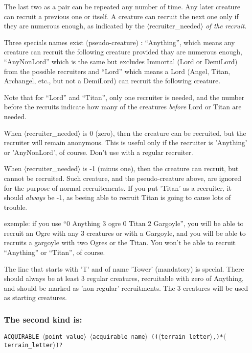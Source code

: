 \documentclass{article}
\begin{document}
The last two as a pair can be repeated any number of time.
Any later creature can recruit a previous one or itself.
A creature can recruit the next one only if they are numerous
enough, as indicated by the $\langle$recruiter\_needed$\rangle$ \emph{of the recruit}.

Three specials names exist (pseudo-creature) : ``Anything'', which
means any creature can recruit the following creature provided
thay are numerous enough, ``AnyNonLord'' which is the same but
excludes Immortal (Lord or DemiLord) from the possible recruiters
and ``Lord''  which means a Lord (Angel, Titan, Archangel, etc., but
not a DemiLord) can recruit the following creature.

Note that for ``Lord'' and ``Titan'', only one recruiter
is needed, and the number before the recruits indicate
how many of the creatures \emph{before} Lord or Titan are
needed.

When $\langle$recruiter\_needed$\rangle$ is 0 (zero), then the creature
can be recruited, but the recruiter will remain anonymous.
This is useful only if the recruiter is 'Anything' or
'AnyNonLord', of course. Don't use with a regular recruiter.

When $\langle$recruiter\_needed$\rangle$ is -1 (minus one), then the creature can
recruit, but cannot be recruited. Such creature, and the
pseudo-creature above, are ignored for the purpose of
normal recruitements. If you put 'Titan' as a recruiter,
it should \emph{always} be -1, as beeing able to recruit
Titan is going to cause lots of trouble.

exemple: if you use ``0 Anything 3 ogre 0 Titan 2 Gargoyle'',
you will be able to recruit an Ogre with any 3 creatures
or with a Gargoyle, and you will be able to recruits
a gargoyle with two Ogres or the Titan. You won't be
able to recruit ``Anything'' or ``Titan'', of course.

The line that starts with 'T' and of name 'Tower' (mandatory) is
special. There should always be at least 3 regular creatures,
recruitable with zero of Anything, and should be marked
as 'non-regular' recruitments. The 3 creatures will be used
as starting creatures.

\subsubsection*{The second kind is:}

\texttt{ACQUIRABLE $\langle$point\_value$\rangle$ $\langle$acquirable\_name$\rangle$ (($\langle$terrain\_letter$\rangle$,)*$\langle$terrain\_letter$\rangle$)?}
\end{document}
